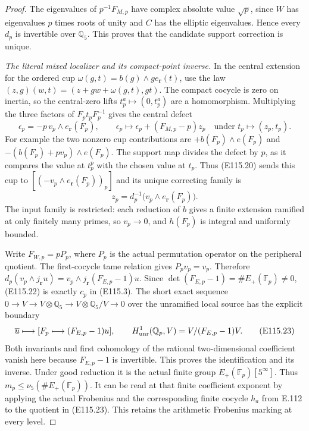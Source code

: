 \begin{proof}
The eigenvalues of $p^{-1}F_{M,p}$ have complex absolute
value $\sqrt p$, since $W$ has eigenvalues $p$ times roots
of unity and $C$ has the elliptic eigenvalues.
Hence every $d_p$ is invertible over $\mathbb Q_5$.
This proves that the candidate support correction is unique.

\emph{The literal mixed localizer and its compact-point inverse.}
In the central extension for the ordered cup
$\omega(g,t)=b(g)\wedge g e_{\mathbf r}(t)$, use the law
$(z,g)(w,t)=(z+gw+\omega(g,t),gt)$.
The compact cocycle is zero on inertia, so the central-zero
lifts $t_p^a\mapsto(0,t_p^a)$ are a homomorphism.
Multiplying the three factors of $F_pt_pF_p^{-1}$ gives
the central defect
\[
 \epsilon_p=-p\,v_p\wedge e_{\mathbf r}(F_p),\qquad
 \epsilon_p\longmapsto\epsilon_p+(F_{M,p}-p)z_p
 \quad\text{under }t_p\mapsto(z_p,t_p).
 \tag{E115.21}
\]
For example the two nonzero cup contributions are
$+b(F_p)\wedge e(F_p)$ and
$-(b(F_p)+p v_p)\wedge e(F_p)$.
The support map divides the defect by $p$, as it compares
the value at $t_p^p$ with the chosen value at $t_p$.
Thus (E115.20) sends this cup to
$[(-v_p\wedge e_{\mathbf r}(F_p))_p]$ and its unique
correcting family is
\[
 z_p=d_p^{-1}\bigl(v_p\wedge e_{\mathbf r}(F_p)\bigr).
 \tag{E115.22}
\]
The input family is restricted: each reduction of $b$ gives
a finite extension ramified at only finitely many primes,
so $v_p\to0$, and $h(F_p)$ is integral and uniformly bounded.

Write $F_{W,p}=pP_p$, where $P_p$ is the actual permutation
operator on the peripheral quotient.  The first-cocycle tame
relation gives $P_pv_p=v_p$.  Therefore
$d_p(v_p\wedge j_{\mathbf r}u)
=v_p\wedge j_{\mathbf r}(F_{E,p}-1)u$.
Since $\det(F_{E,p}-1)=\#E_+(\mathbb F_p)\ne0$,
(E115.22) is exactly $c_p$ in (E115.3).
The short exact sequence $0\to V\to V\otimes\mathbb Q_5
\to V\otimes\mathbb Q_5/V\to0$ over the unramified
local source has the explicit boundary
\[
 \overline u\longmapsto
       [F_p\longmapsto(F_{E,p}-1)u],\qquad
 H^1_{\rm unr}(\mathbb Q_p,V)=V/(F_{E,p}-1)V.
 \tag{E115.23}
\]
Both invariants and first cohomology of the rational
two-dimensional coefficient vanish here because $F_{E,p}-1$
is invertible.  This proves the identification and its inverse.
Under good reduction it is the actual finite group
$E_+(\mathbb F_p)[5^\infty]$.
Thus $m_p\le\nu_5(\#E_+(\mathbb F_p))$.
It can be read at that finite coefficient exponent by applying
the actual Frobenius and the corresponding finite cocycle
$h_a$ from E.112 to the quotient in (E115.23).
This retains the arithmetic Frobenius marking at every level.


\end{proof}
